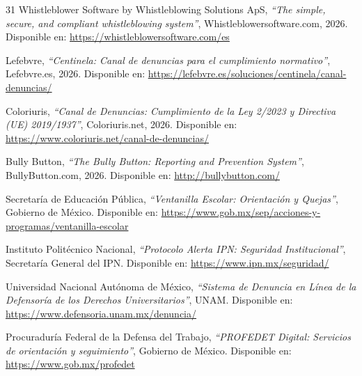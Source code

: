 \begin{thebibliography}{31}
Whistleblower Software by Whistleblowing Solutions ApS, \textit{``The simple, secure, and compliant whistleblowing system''}, Whistleblowersoftware.com, 2026. Disponible en: \url{https://whistleblowersoftware.com/es}

Lefebvre, \textit{``Centinela: Canal de denuncias para el cumplimiento normativo''}, Lefebvre.es, 2026. Disponible en: \url{https://lefebvre.es/soluciones/centinela/canal-denuncias/}

Coloriuris, \textit{``Canal de Denuncias: Cumplimiento de la Ley 2/2023 y Directiva (UE) 2019/1937''}, Coloriuris.net, 2026. Disponible en: \url{https://www.coloriuris.net/canal-de-denuncias/}

Bully Button, \textit{``The Bully Button: Reporting and Prevention System''}, BullyButton.com, 2026. Disponible en: \url{http://bullybutton.com/}

Secretaría de Educación Pública, \textit{``Ventanilla Escolar: Orientación y Quejas''}, Gobierno de México. Disponible en: \url{https://www.gob.mx/sep/acciones-y-programas/ventanilla-escolar}

Instituto Politécnico Nacional, \textit{``Protocolo Alerta IPN: Seguridad Institucional''}, Secretaría General del IPN. Disponible en: \url{https://www.ipn.mx/seguridad/}

Universidad Nacional Autónoma de México, \textit{``Sistema de Denuncia en Línea de la Defensoría de los Derechos Universitarios''}, UNAM. Disponible en: \url{https://www.defensoria.unam.mx/denuncia/}

Procuraduría Federal de la Defensa del Trabajo, \textit{``PROFEDET Digital: Servicios de orientación y seguimiento''}, Gobierno de México. Disponible en: \url{https://www.gob.mx/profedet}

\end{thebibliography}